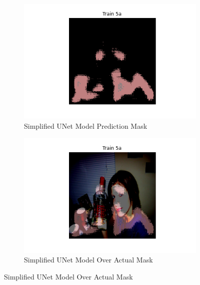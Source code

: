 \documentclass{article}
\begin{document}
\begin{figure}[h!]
  \centering
  \begin{subfigure}[b]{0.45\textwidth}
      \centering
      \includegraphics[width=\textwidth]{include/plots/train_5_a_pred.png}
      \caption{Simplified UNet Model Prediction Mask}
      \label{fig:simplified_unet_msk}
  \end{subfigure}
  \hfill %
  \begin{subfigure}[b]{0.45\textwidth}
      \centering
      \includegraphics[width=\textwidth]{include/plots/train_5_a_over_actual.png} %
      \caption{Simplified UNet Model Over Actual Mask}
      \label{fig:simplified_unet_over_actual}
  \end{subfigure}
  \label{fig:simplified_unet_masks_visualization}
\end{figure}
\end{document}
